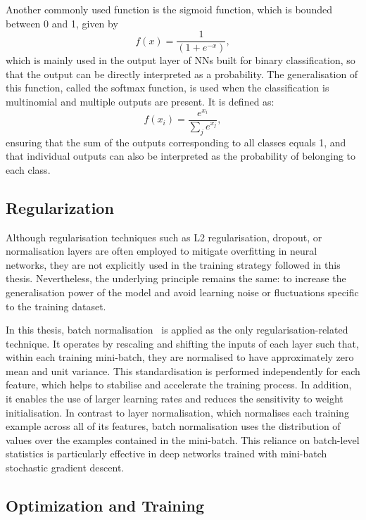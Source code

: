 Another commonly used function is the sigmoid function, which is bounded between 0 and 1, given by
\begin{equation}
  f (x) = \frac{1}{(1 +e^{−x})},
\end{equation}
which is mainly used in the output layer of NNs built for binary classification, so that the output can be directly interpreted as a probability. The generalisation of this function, called the softmax function, is used when the classification is multinomial and multiple outputs are present. It is defined as:
\begin{equation}
    f (x_{i}) = \frac{e^{x_{i}}}{\sum_{j}e^{x_{j}}},
\end{equation}
ensuring that the sum of the outputs corresponding to all classes equals 1, and that individual outputs can also be interpreted as the probability of belonging to each class.

\subsection{Regularization}

Although regularisation techniques such as L2 regularisation, dropout, or normalisation layers are often employed to mitigate overfitting in neural networks, they are not explicitly used in the training strategy followed in this thesis. Nevertheless, the underlying principle remains the same: to increase the generalisation power of the model and avoid learning noise or fluctuations specific to the training dataset.

In this thesis, batch normalisation~\cite{ioffe2015batchnormalizationacceleratingdeep} is applied as the only regularisation-related technique. It operates by rescaling and shifting the inputs of each layer such that, within each training mini-batch, they are normalised to have approximately zero mean and unit variance. This standardisation is performed independently for each feature, which helps to stabilise and accelerate the training process. In addition, it enables the use of larger learning rates and reduces the sensitivity to weight initialisation. In contrast to layer normalisation, which normalises each training example across all of its features, batch normalisation uses the distribution of values over the examples contained in the mini-batch. This reliance on batch-level statistics is particularly effective in deep networks trained with mini-batch stochastic gradient descent.

\subsection{Optimization and Training}

